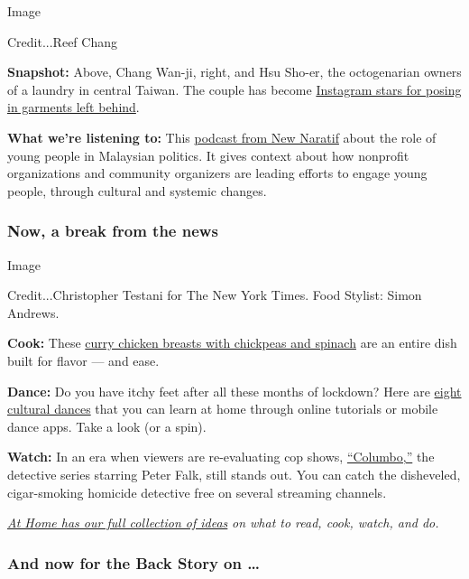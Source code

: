 Image

Credit...Reef Chang

\textbf{Snapshot:} Above, Chang Wan-ji, right, and Hsu Sho-er, the
octogenarian owners of a laundry in central Taiwan. The couple has
become
\href{https://www.nytimes.com/2020/07/24/world/asia/taiwan-octogenarian-couple-instagram-laundry.html}{Instagram
stars for posing in garments left behind}.

\textbf{What we're listening to:} This
\href{https://newnaratif.com/podcast/youth-power-in-malaysian-politics/}{podcast
from New Naratif} about the role of young people in Malaysian politics.
It gives context about how nonprofit organizations and community
organizers are leading efforts to engage young people, through cultural
and systemic changes.

\hypertarget{now-a-break-from-the-news}{%
\subsubsection{Now, a break from the
news}\label{now-a-break-from-the-news}}

Image

Credit...Christopher Testani for The New York Times. Food Stylist: Simon
Andrews.

\textbf{Cook:} These
\href{https://cooking.nytimes.com/recipes/1020309-curry-chicken-breasts-with-chickpeas-and-spinach}{curry
chicken breasts with chickpeas and spinach} are an entire dish built for
flavor --- and ease.

\textbf{Dance:} Do you have itchy feet after all these months of
lockdown? Here are
\href{https://www.nytimes.com/2020/07/25/travel/cultural-dances-tutorials.html}{eight
cultural dances} that you can learn at home through online tutorials or
mobile dance apps. Take a look (or a spin).

\textbf{Watch:} In an era when viewers are re-evaluating cop shows,
\href{https://www.nytimes.com/2020/07/24/arts/television/columbo-watch.html}{``Columbo,''}
the detective series starring Peter Falk, still stands out. You can
catch the disheveled, cigar-smoking homicide detective free on several
streaming channels.

\href{https://www.nytimes.com/spotlight/at-home}{\emph{At Home has our
full collection of ideas}} \emph{on what to read, cook, watch, and do.}

\hypertarget{and-now-for-the-back-story-on-}{%
\subsubsection{And now for the Back Story on
\ldots{}}\label{and-now-for-the-back-story-on-}}

